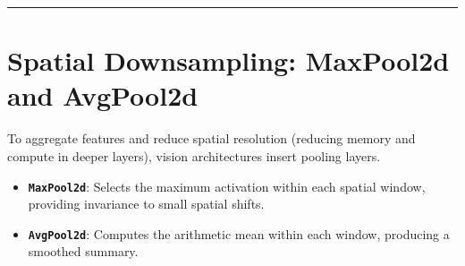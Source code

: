 \documentclass[
  letterpaper,
]{scrbook}
\providecommand{\tightlist}{%
  \setlength{\itemsep}{0pt}\setlength{\parskip}{0pt}}
\begin{document}
\begin{center}\rule{0.5\linewidth}{0.5pt}\end{center}

\section{Spatial Downsampling: MaxPool2d and
AvgPool2d}\label{spatial-downsampling-maxpool2d-and-avgpool2d}

To aggregate features and reduce spatial resolution (reducing memory and
compute in deeper layers), vision architectures insert pooling layers.

\begin{itemize}
\tightlist
\item
  \textbf{\texttt{MaxPool2d}}: Selects the maximum activation within
  each spatial window, providing invariance to small spatial shifts.
\item
  \textbf{\texttt{AvgPool2d}}: Computes the arithmetic mean within each
  window, producing a smoothed summary.
\end{itemize}
\end{document}
